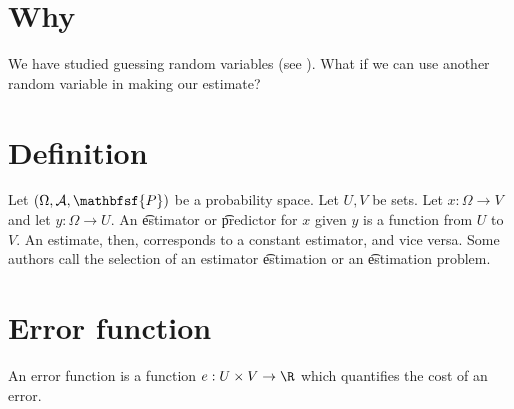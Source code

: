 

\section*{Why}

We have studied guessing random variables (see ).
What if we can use another random variable in making our estimate?

\section*{Definition}

Let $(\Omega , \mathcal{A} , \mathbfsf{P} )$ be a probability space.
Let $U, V$ be sets.
Let $x: \Omega  \to V$ and let $y: \Omega  \to U$.
An \t{estimator} or \t{predictor} for $x$ given $y$ is a function from $U$ to $V$.
An estimate, then, corresponds to a constant estimator, and vice versa.
Some authors call the selection of an estimator \t{estimation} or an \t{estimation problem}.

\section*{Error function}

An error function is a function $e: U \times  V \to \R $ which quantifies the cost of an error.

\blankpage